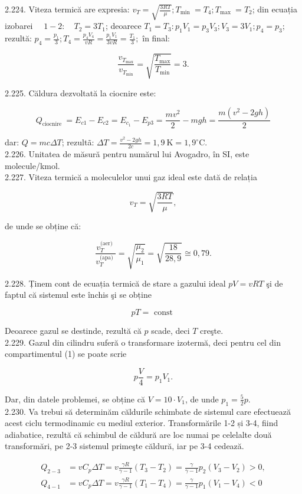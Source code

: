\documentclass[10pt]{article}
\begin{document}
2.224. Viteza termică are expresia: $v_{T}=\sqrt{\frac{3 R T}{\mu}} ; T_{\text {min }}=T_{4} ; T_{\text {max }}=T_{2}$; din ecuația izobarei $\quad 1-2: \quad T_{2}=3 T_{1}$; deoarece $T_{1}=T_{3}: p_{1} V_{1}=p_{3} V_{3} ; V_{3}=3 V_{1} ; p_{4}=p_{3} ;$ rezultă: $p_{4}=\frac{p_{1}}{3} ; T_{4}=\frac{p_{4} V_{4}}{v R}=\frac{p_{1} V_{1}}{3 v R}=\frac{T_{1}}{3} ;$ în final:

$$
\frac{v_{T_{\max }}}{v_{T_{\min }}}=\sqrt{\frac{T_{\max }}{T_{\min }}}=3 .
$$

2.225. Căldura dezvoltată la ciocnire este:

$$
Q_{\text {ciocnire }}=E_{c 1}-E_{c 2}=E_{c_{1}}-E_{p 3}=\frac{m v^{2}}{2}-m g h=\frac{m\left(v^{2}-2 g h\right)}{2}
$$

dar: $Q=m c \Delta T$; rezultã: $\Delta T=\frac{v^{2}-2 g h}{2 c}=1,9 \mathrm{~K}=1,9^{\circ} \mathrm{C}$.\\
2.226. Unitatea de măsură pentru numărul lui Avogadro, în SI, este molecule/kmol.\\
2.227. Viteza termică a moleculelor unui gaz ideal este dată de relația

$$
v_{T}=\sqrt{\frac{3 R T}{\mu}},
$$

de unde se obține că:

$$
\frac{v_{T}^{\text {(aer) }}}{v_{T}^{\text {(apa) }}}=\sqrt{\frac{\mu_{2}}{\mu_{1}}}=\sqrt{\frac{18}{28,9}} \cong 0,79 .
$$

2.228. Ținem cont de ecuația termică de stare a gazului ideal $p V=v R T$ şi de faptul că sistemul este închis şi se obține

$$
p T=\text { const }
$$

Deoarece gazul se destinde, rezultă că $p$ scade, deci $T$ creşte.\\
2.229. Gazul din cilindru suferă o transformare izotermă, deci pentru cel din compartimentul (1) se poate scrie

$$
p \frac{V}{4}=p_{1} V_{1} .
$$

Dar, din datele problemei, se obține că $V=10 \cdot V_{1}$, de unde $p_{1}=\frac{5}{2} p$.\\
2.230. Va trebui să determinăm căldurile schimbate de sistemul care efectuează acest ciclu termodinamic cu mediul exterior. Transformările 1-2 și 3-4, fiind adiabatice, rezultă că schimbul de căldură are loc numai pe celelalte două transformări, pe 2-3 sistemul primeşte căldură, iar pe 3-4 cedează.

$$
\begin{aligned}
Q_{2-3} & =v C_{p} \Delta T=v \frac{\gamma R}{\gamma-1}\left(T_{3}-T_{2}\right)=\frac{\gamma}{\gamma-1} p_{2}\left(V_{3}-V_{2}\right)>0, \\
Q_{4-1} & =v C_{p} \Delta T=v \frac{\gamma R}{\gamma-1}\left(T_{1}-T_{4}\right)=\frac{\gamma}{\gamma-1} p_{1}\left(V_{1}-V_{4}\right)<0
\end{aligned}
$$
\end{document}
